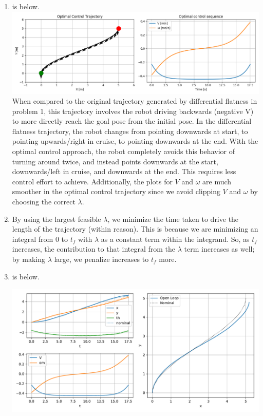 \documentclass{article}
\begin{document}
\begin{enumerate}[label=(\roman*)]
    \item {} is below. \\ \includegraphics[scale=0.5]{plots/optimal_control.png}
    \\
    When compared to the original trajectory generated by differential flatness in problem 1, this trajectory involves the robot driving backwards (negative V) to more directly reach the goal pose from the initial pose. In the differential flatness trajectory, the robot changes from pointing downwards at start, to pointing upwards/right in cruise, to pointing downwards at the end. With the optimal control approach, the robot completely avoids this behavior of turning around twice, and instead points downwards at the start, downwards/left in cruise, and downwards at the end. This requires less control effort to achieve. Additionally, the plots for $V$ and $\omega$ are much smoother in the optimal control trajectory since we avoid clipping $V$ and $\omega$ by choosing the correct $\lambda$.
    
    \item By using the largest feasible $\lambda$, we minimize the time taken to drive the length of the trajectory (within reason). This is because we are minimizing an integral from $0$ to $t_f$ with $\lambda$ as a constant term within the integrand. So, as $t_f$ increases, the contribution to that integral from the $\lambda$ term increases as well; by making $\lambda$ large, we penalize increases to $t_f$ more.
    
    \item {} is below.
    
    \includegraphics[scale=0.6]{plots/sim_traj_optimal_control.pdf}
    
\end{enumerate}
\end{document}
